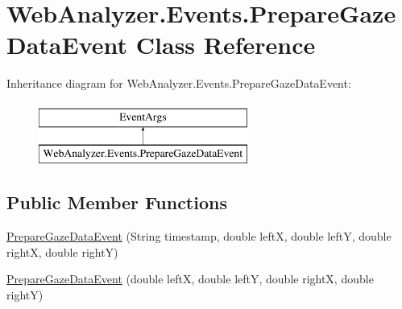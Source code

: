 \hypertarget{class_web_analyzer_1_1_events_1_1_prepare_gaze_data_event}{}\section{Web\+Analyzer.\+Events.\+Prepare\+Gaze\+Data\+Event Class Reference}
\label{class_web_analyzer_1_1_events_1_1_prepare_gaze_data_event}
Inheritance diagram for Web\+Analyzer.\+Events.\+Prepare\+Gaze\+Data\+Event\+:\begin{figure}[H]
\begin{center}
\leavevmode
\includegraphics[height=2.000000cm]{class_web_analyzer_1_1_events_1_1_prepare_gaze_data_event}
\end{center}
\end{figure}
\subsection*{Public Member Functions}
\begin{DoxyCompactItemize}
\item 
\hyperlink{class_web_analyzer_1_1_events_1_1_prepare_gaze_data_event_a4454a93dfb1027db1d538b35c0294d93}{Prepare\+Gaze\+Data\+Event} (String timestamp, double left\+X, double left\+Y, double right\+X, double right\+Y)
\item 
\hyperlink{class_web_analyzer_1_1_events_1_1_prepare_gaze_data_event_a668ee572e96806690256b509f09b6091}{Prepare\+Gaze\+Data\+Event} (double left\+X, double left\+Y, double right\+X, double right\+Y)
\end{DoxyCompactItemize}
